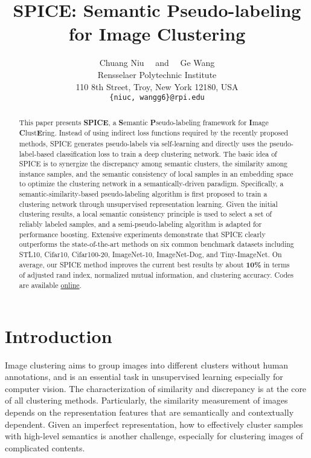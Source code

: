 \documentclass[10pt,twocolumn,letterpaper]{article}
\begin{document}
\title{SPICE: Semantic Pseudo-labeling for Image Clustering}

\author{Chuang Niu \ \ and \ \  Ge Wang\\
Rensselaer Polytechnic Institute\\
110 8th Street, Troy, New York 12180, USA\\
{\tt\small \{niuc, wangg6\}@rpi.edu}
}

\maketitle
\ificcvfinal\thispagestyle{empty}\fi

\begin{abstract}
    This paper presents \textbf{SPICE}, a \textbf{S}emantic \textbf{P}seudo-labeling framework for \textbf{I}mage \textbf{C}lust\textbf{E}ring.
    Instead of using indirect loss functions required by the recently proposed methods, SPICE generates pseudo-labels via self-learning and directly uses the pseudo-label-based classification loss to train a deep clustering network.
    The basic idea of SPICE is to synergize the discrepancy among semantic clusters, the similarity among instance samples, and the semantic consistency of local samples in an embedding space to optimize the clustering network in a semantically-driven paradigm.
    Specifically, a semantic-similarity-based pseudo-labeling algorithm is first proposed to train a clustering network through unsupervised representation learning. Given the initial clustering results, a local semantic consistency principle is used to select a set of reliably labeled samples, and a semi-pseudo-labeling algorithm is adapted for performance boosting.
    Extensive experiments demonstrate that SPICE clearly outperforms the state-of-the-art methods on six common benchmark datasets including STL10, Cifar10, Cifar100-20, ImageNet-10, ImageNet-Dog, and Tiny-ImageNet. On average, our SPICE method improves the current best results by about \textbf{10\%} in terms of  adjusted rand index, normalized mutual information, and clustering accuracy. Codes are available \href{https://github.com/niuchuangnn/SPICE}{online}.

\end{abstract}

\section{Introduction}

Image clustering aims to group images into different clusters without human annotations, and is an essential task in unsupervised learning especially for computer vision. The characterization of similarity and discrepancy is at the core of all clustering methods. Particularly, the similarity measurement of images depends on the representation features that are semantically and contextually dependent. Given an imperfect representation, how to effectively cluster samples with high-level semantics is another challenge, especially for clustering images of complicated contents.
\end{document}
